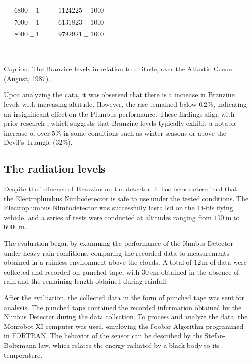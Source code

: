 \documentclass[portuguese]{cenarticle}
\begin{document}
\begin{table}[!h]
\begin{center}
\begin{tabular}{@{}lccc@{}}
                                           & $6800\pm 1$       & $-$                &    $1124225 \pm 1000$              \\ 
                                           & $7000\pm 1$       & $-$                &    $6131823 \pm 1000$              \\ 
                                           & $8000\pm 1$       & $-$                &    $9792921 \pm 1000$              \\ \bottomrule
    \end{tabular}\\[3mm]
  \end{center}
  Caption: The Branzine levels in relation to altitude, over the Atlantic Ocean (August, 1987).\\
  \end{table}
  \vspace{-6mm}
  Upon analyzing the data, it was observed that there is a increase in Branzine levels with increasing altitude. However, the rise remained below $0.2\%$, indicating an insignificant effect on the Plumbus performance. These findings align with prior research \citep{Gagaia1923}, which suggests that Branzine levels typically exhibit a notable increase of over $5\%$ in some conditions such as winter seasons or above the Devil's Triangle ($32\%$).

  \subsection{The radiation levels}

  Despite the influence of Branzine on the detector, it has been determined that the Electroplumbus Nimbodetector is safe to use under the tested conditions. The Electroplumbus Nimbodetector was successfully installed on the 14-bis flying vehicle, and a series of tests were conducted at altitudes ranging from $\SI{100}{\meter}$ to $\SI{6000}{\meter}$.

  The evaluation began by examining the performance of the Nimbus Detector under heavy rain conditions, comparing the recorded data to measurements obtained in a rainless environment above the clouds. A total of $\SI{12}{\meter}$ of data were collected and recorded on punched tape, with $\SI{30}{\centi\meter}$ obtained in the absence of rain and the remaining length obtained during rainfall.

  After the evaluation, the collected data in the form of punched tape was sent for analysis. The punched tape contained the recorded information obtained by the Nimbus Detector during the data collection. To process and analyze the data, the Monrobot XI computer was used, employing the Foobar Algorithm programmed in FORTRAN. The behavior of the sensor can be described by the Stefan-Boltzmann law, which relates the energy radiated by a black body to its temperature.
\end{document}
